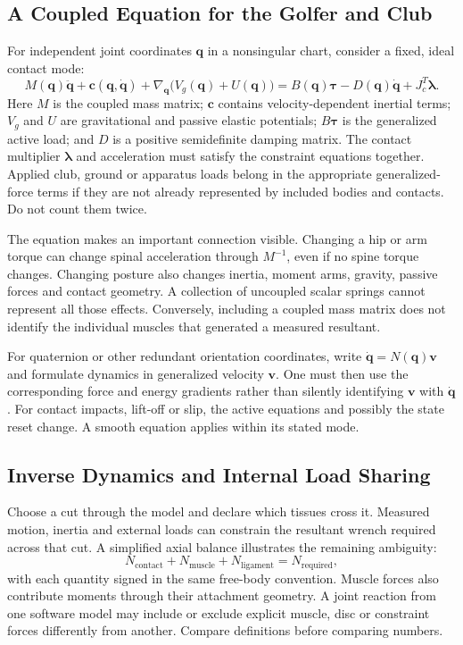 \subsection{A Coupled Equation for the Golfer and Club}
For independent joint coordinates $\bm q$ in a nonsingular chart, consider a fixed, ideal contact mode:
\begin{equation}
M(\bm q)\ddot{\bm q}+\bm c(\bm q,\dot{\bm q})
+\nabla_{\bm q}\bigl(V_g(\bm q)+U(\bm q)\bigr)
=B(\bm q)\bm\tau-D(\bm q)\dot{\bm q}+J_c^T\bm\lambda.
\end{equation}
Here $M$ is the coupled mass matrix; $\bm c$ contains velocity-dependent inertial terms; $V_g$ and $U$ are gravitational and passive elastic potentials; $B\bm\tau$ is the generalized active load; and $D$ is a positive semidefinite damping matrix. The contact multiplier $\bm\lambda$ and acceleration must satisfy the constraint equations together. Applied club, ground or apparatus loads belong in the appropriate generalized-force terms if they are not already represented by included bodies and contacts. Do not count them twice.

The equation makes an important connection visible. Changing a hip or arm torque can change spinal acceleration through $M^{-1}$, even if no spine torque changes. Changing posture also changes inertia, moment arms, gravity, passive forces and contact geometry. A collection of uncoupled scalar springs cannot represent all those effects. Conversely, including a coupled mass matrix does not identify the individual muscles that generated a measured resultant.

For quaternion or other redundant orientation coordinates, write $\dot{\bm q}=N(\bm q)\bm v$ and formulate dynamics in generalized velocity $\bm v$. One must then use the corresponding force and energy gradients rather than silently identifying $\bm v$ with $\dot{\bm q}$. For contact impacts, lift-off or slip, the active equations and possibly the state reset change. A smooth equation applies within its stated mode.

\subsection{Inverse Dynamics and Internal Load Sharing}
Choose a cut through the model and declare which tissues cross it. Measured motion, inertia and external loads can constrain the resultant wrench required across that cut. A simplified axial balance illustrates the remaining ambiguity:
\begin{equation}
N_{\mathrm{contact}}+N_{\mathrm{muscle}}+N_{\mathrm{ligament}}
=N_{\mathrm{required}},
\end{equation}
with each quantity signed in the same free-body convention. Muscle forces also contribute moments through their attachment geometry. A joint reaction from one software model may include or exclude explicit muscle, disc or constraint forces differently from another. Compare definitions before comparing numbers.

